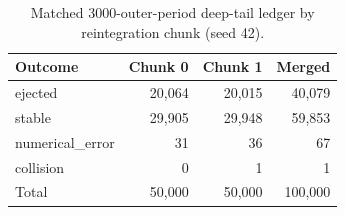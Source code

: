 \begin{table}
  \centering
  \caption{Matched 3000-outer-period deep-tail ledger by reintegration chunk (seed 42).}
  \label{tab:tail_ledger}
  \begin{tabular}{lrrr}
    \toprule
    Outcome & Chunk 0 & Chunk 1 & Merged \\
    \midrule
    ejected & 20,064 & 20,015 & 40,079 \\
    stable & 29,905 & 29,948 & 59,853 \\
    numerical\_error & 31 & 36 & 67 \\
    collision & 0 & 1 & 1 \\
    \midrule
    Total & 50,000 & 50,000 & 100,000 \\
    \bottomrule
  \end{tabular}
\end{table}
